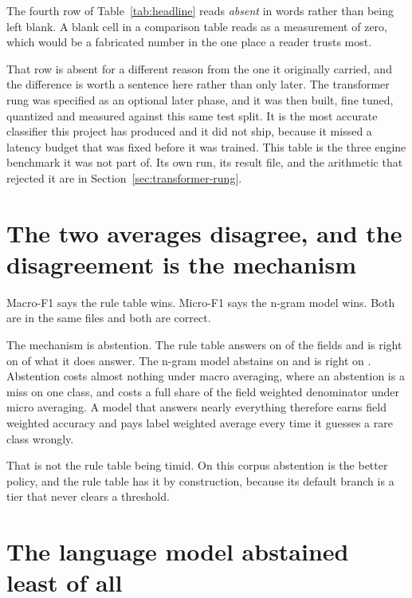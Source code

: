 The fourth row of Table~\ref{tab:headline} reads \emph{absent} in words rather
than being left blank. A blank cell in a comparison table reads as a measurement
of zero, which would be a fabricated number in the one place a reader trusts
most.

That row is absent for a different reason from the one it originally carried, and
the difference is worth a sentence here rather than only later. The transformer
rung was specified as an optional later phase, and it was then built, fine tuned,
quantized and measured against this same test split. It is the most accurate
classifier this project has produced and it did not ship, because it missed a
latency budget that was fixed before it was trained. This table is the three
engine benchmark it was not part of. Its own run, its result file, and the
arithmetic that rejected it are in Section~\ref{sec:transformer-rung}.

\section{The two averages disagree, and the disagreement is the mechanism}

Macro-F1 says the rule table wins. Micro-F1 says the n-gram model wins. Both are
in the same files and both are correct.

The mechanism is abstention. The rule table answers  on
\vRulesAbstention{} of the fields and is right on \vRulesCommittedAccuracy{} of
what it does answer. The n-gram model abstains on \vNgramAbstention{} and is
right on \vNgramCommittedAccuracy{}. Abstention costs almost nothing under macro
averaging, where an abstention is a miss on one class, and costs a full share of
the field weighted denominator under micro averaging. A model that answers nearly
everything therefore earns field weighted accuracy and pays label weighted
average every time it guesses a rare class wrongly.

\begin{table}[htbp]
  \centering
  \caption{Abstention, and accuracy on the fields each engine did commit to.}
  \label{tab:abstention}
  
\end{table}

That is not the rule table being timid. On this corpus abstention is the better
policy, and the rule table has it by construction, because its default branch is
a tier that never clears a threshold.

\section{The language model abstained least of all}

